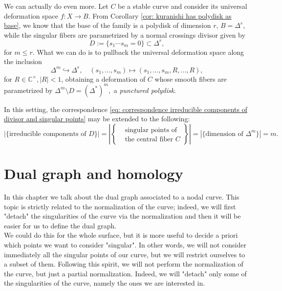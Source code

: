 \documentclass[a4paper,12 pt,titlepage,twoside]{book}
\newcommand{\numberset}{\mathbb}
\newcommand{\C}{\numberset{C}}
\theoremstyle{plain}
\theoremstyle{theorem}
\theoremstyle{definition}
\theoremstyle{remark}
\begin{document}
We can actually do even more. Let $C$ be a stable curve and consider its universal deformation space $f \colon X \rightarrow B.$ From Corollary \ref{cor: kuranishi has polydisk as base}, we know that the base of the family is a polydisk of dimension $r$, $B = \Delta^r$, while the singular fibers are parametrized by a normal crossings divisor given by $$D := \{s_1 \cdots s_m =0\} \subset \Delta^r,$$ for $m \le r.$ What we can do is to pullback the universal deformation space along the inclusion $$\Delta^m \hookrightarrow \Delta^r, \quad (s_1, \dots, s_m) \mapsto (s_1, \dots, s_m, R, \dots, R),$$ for $R \in \C^\times, |R|<1$, obtaining a deformation of $C$ whose smooth fibers are parametrized by $\Delta^m \setminus D = (\Delta^*)^m,$ a \emph{punctured polydisk}. \begin{center}
\end{center}
In this setting, the correspondence \eqref{eq: correspondence irreducible components of divisor and singular points} may be extended to the following: \begin{equation}\label{eq: restriction to r case}
|\{\text{irreducible components of } D\}|= \left|\left\{\begin{aligned} &\text{singular points of} \\ &\text{the central fiber } C\end{aligned}\right\}\right|= |\{\text{dimension of } \Delta^m\}| =m.
\end{equation}
\newpage

\chapter{Dual graph and homology}\label{sec: dual graph and homology}
	In this chapter we talk about the dual graph associated to a nodal curve. This topic is strictly related to the normalization of the curve; indeed, we will first "detach" the singularities of the curve via the normalization and then it will be easier for us to define the dual graph.\\We could do this for the whole surface, but it is more useful to decide a priori which points we want to consider "singular". In other words, we will not consider immediately all the singular points of our curve, but we will restrict ourselves to a subset of them. Following this spirit, we will not perform the normalization of the curve, but just a partial normalization. Indeed, we will "detach" only some of the singularities of the curve, namely the ones we are interested in. 
	
\end{document}
